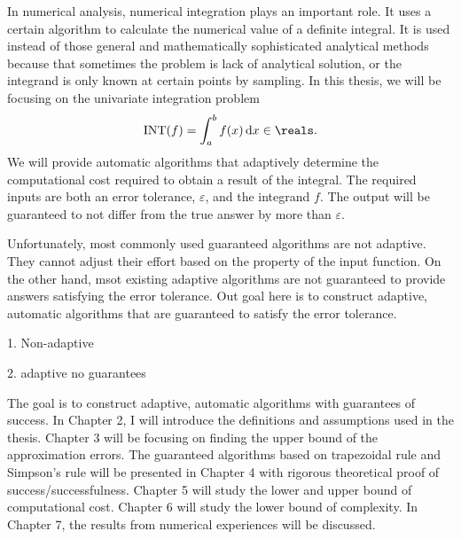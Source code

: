 \documentclass[draft]{iitthesis}
\theoremstyle{definition}
\theoremstyle{remark}
\begin{document}
In numerical analysis, numerical integration plays an important role. It uses a certain algorithm to calculate the numerical value of a definite integral. It is used instead of those general and mathematically sophisticated analytical methods because that sometimes the problem is lack of analytical solution, or the integrand is only known at certain points by sampling. In this thesis, we will be focusing on the univariate integration problem
\begin{equation}\label{integral}
    \text{INT}(f)=\int_{a}^{b}f(x)\,\textup{d}x\in\reals.
\end{equation}
We will provide automatic algorithms that adaptively determine the computational cost required to obtain a result of the integral. The required inputs are both an error tolerance, $\varepsilon$, and the integrand $f$. The output will be guaranteed to not differ from the true answer by more than $\varepsilon$.

Unfortunately, most commonly used guaranteed algorithms are not adaptive. They cannot adjust their effort based on the property of the input function. On the other hand, msot existing adaptive algorithms are not guaranteed to provide answers satisfying the error tolerance. Out goal here is to construct adaptive, automatic algorithms that are guaranteed to satisfy the error tolerance.


1. Non-adaptive


2. adaptive no guarantees







The goal is to construct adaptive, automatic algorithms with guarantees of success. In Chapter 2, I will introduce the definitions and assumptions used in the thesis. Chapter 3 will be focusing on finding the upper bound of the approximation errors. The guaranteed algorithms based on trapezoidal rule and Simpson's rule will be presented in Chapter 4 with rigorous theoretical proof of success/successfulness. Chapter 5 will study the lower and upper bound of computational cost. Chapter 6 will study the lower bound of complexity. In Chapter 7, the results from numerical experiences will be discussed.

\clearpage
\end{document}
